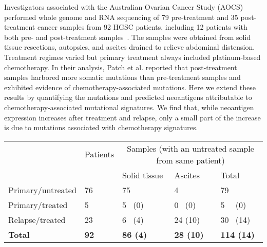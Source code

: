 \documentclass[linenumbers]{bmcart}
\begin{document}
Investigators associated with the Australian Ovarian Cancer Study (AOCS) performed whole genome and RNA sequencing of 79 pre-treatment and 35 post-treatment cancer samples from 92 HGSC patients, including 12 patients with both pre- and post-treatment samples~\cite{Patch_2015}. The samples were obtained from solid tissue resections, autopsies, and ascites drained to relieve abdominal distension. Treatment regimes varied but primary treatment always included platinum-based chemotherapy. In their analysis, Patch et al. reported that post-treatment samples harbored more somatic mutations than pre-treatment samples and exhibited evidence of chemotherapy-associated mutations. Here we extend these results by quantifying the mutations and predicted neoantigens attributable to chemotherapy-associated mutational signatures. We find that, while neoantigen expression increases after treatment and relapse, only a small part of the increase is due to mutations associated with chemotherapy signatures.

\begin{table}[]
\centering
\begin{tabular}{lllll}
                  & Patients & \multicolumn{3}{c}{Samples (with an untreated sample from same patient)} \\
                  &          & Solid tissue              & Ascites              & Total                 \\
Primary/untreated & 76       & 75                        & 4                    & 79                    \\
Primary/treated   & 5        & 5 \, (0)                     & 0 \, (0)                & 5 \, \, (0)                 \\
Relapse/treated   & 23       & 6 \, (4)                     & 24 (10)              & 30 \, (14)               \\
\textbf{Total}             & \textbf{92}       & \textbf{86 (4)}                    & \textbf{28 (10)}              & \textbf{114 (14)}             
\end{tabular}
\end{table}
\end{document}
